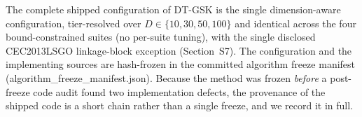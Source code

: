 \documentclass[algorithms,article,submit,moreauthors,pdftex]{Definitions/mdpi}
\newcommand{\dtgsk}{DT-GSK}
\begin{document}
The complete shipped configuration of \dtgsk{} is the single
dimension-aware configuration, tier-resolved over
$D \in \{10, 30, 50, 100\}$ and identical across the four
bound-constrained suites (no per-suite tuning), with the single
disclosed CEC2013LSGO linkage-block exception (Section~S7).
The configuration and the implementing sources are hash-frozen in the
committed algorithm freeze manifest
(algorithm\_freeze\_manifest.json).  Because the method was frozen
\emph{before} a post-freeze code audit found two implementation defects, the
provenance of the shipped code is a short chain rather than a single freeze, and
we record it in full.

\end{document}
